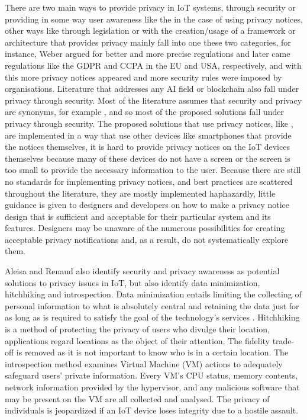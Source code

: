 There are two main ways to provide privacy in IoT systems, through security
or providing in some way user awareness like the in the case of using privacy
notices, other ways like through legislation or with the
creation/usage of a framework or architecture that provides privacy mainly
fall into one these two categories, for instance, Weber \cite{WEBER2015618} argued
for better and more precise regulations and later came regulations like the GDPR and CCPA in
the EU and USA, respectively, and with this more privacy notices appeared and
more security rules were imposed by organisations. Literature that addresses
any AI field \cite{zhao2020local, AntunesFederated, zhang2017privacy} or
blockchain \cite{AliIoT} also fall under privacy through security.
Most of the literature assumes that security and privacy are
synonyms, for example \cite{opara2022framework, FabianoInternet, SunSecure},
and so most of the proposed solutions fall under privacy through security.
The proposed solutions that use privacy notices, like \cite{FengDesign},
are implemented in a way that use other devices like smartphones that provide
the notices themselves, it is hard to provide privacy notices on the IoT
devices themselves because many of these devices do not have a screen or
the screen is too small to provide the necessary information to the user.
Because there are still no standards for implementing privacy notices, and
best practices are scattered throughout the literature, they are mostly
implemented haphazardly, little guidance is given to designers and developers
on how to make a privacy notice design that is sufficient and acceptable
for their particular system and its features. Designers may be unaware of
the numerous possibilities for creating acceptable privacy notifications
and, as a result, do not systematically explore them.

Aleisa and Renaud \cite{aleisa2016privacy} also identify security and privacy
awareness as potential solutions to privacy issues in IoT, but also identify
data minimization, hitchhiking and introspection. Data minimization entails
limiting the collecting of personal information to what is absolutely central
and retaining the data just for as long as is required to satisfy the goal
of the technology's services \cite{ojDirective281}. Hitchhiking \cite{tang2006putting}
is a method of protecting the privacy of users who divulge their location,
applications regard locations as the object of their attention. The fidelity
trade-off is removed as it is not important to know who is in a certain
location. The introspection \cite{kang2015protection} method examines Virtual
Machine (VM) actions to adequately safeguard users' private information.
Every VM's CPU status, memory contents, network information provided by the
hypervisor, and any malicious software that may be present on the VM are
all collected and analysed. The privacy of individuals is jeopardized if
an IoT device loses integrity due to a hostile assault.

